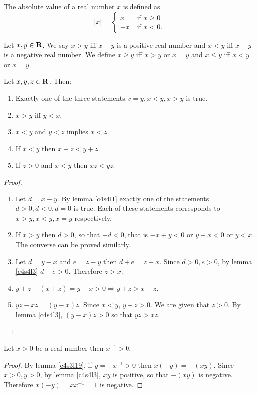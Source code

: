 \begin{defn}\label{c4s4d3}
The absolute value of a real number $x$ is defined as 
\[
|x| = \begin{cases}
 x & \text{ if } x \ge 0 \\
 -x & \text{ if } x < 0.
\end{cases}
\]
\end{defn}

\begin{defn}\label{c4s4d4}
Let $x, y \in \mathbf{R}$. We say $x > y$ iff $x - y$ is a positive real number
and $x < y$ iff $x - y$ is a negative real number. We define $x \ge y$ iff
$x > y$ or $x = y$ and $x \le y$ iff $x < y$ or $x = y$.
\end{defn}

\begin{prop}\label{c4s4p1}
Let $x, y, z \in \mathbf{R}$. Then:
\begin{enumerate}
\item Exactly one of the three statements $x = y, x < y, x > y$ is true.
\item $x > y$ iff $y < x$.
\item $x < y$ and $y < z$ implies $x < z$.
\item If $x < y$ then $x + z < y + z$.
\item If $z > 0$ and $x < y$ then $xz < yz$.
\end{enumerate}
\end{prop}
\begin{proof}
\begin{enumerate}
\item Let $d = x - y$. By lemma \ref{c4s4l1} exactly one of the statements
$d > 0, d < 0, d = 0$ is true. Each of these statements corresponds to 
$x > y, x < y, x = y$ respectively.
\item If $x > y$ then $d > 0$, so that $-d < 0$, that is $-x + y < 0$ or 
$y - x < 0$ or $y < x$. The converse can be proved similarly.
\item Let $d = y - x$ and $e = z - y$ then $d + e = z - x$. Since $d > 0,
e > 0$, by lemma \ref{c4s4l3} $d + e > 0$. Therefore $z > x$.
\item $y + z - (x + z) = y - x > 0 \Rightarrow y + z > x + z$.
\item $yz - xz = (y - x)z$. Since $x < y$, $y - z > 0$. We are given that
$z > 0$. By lemma \ref{c4s4l3}, $(y - x)z > 0$ so that $yz > xz$.
\end{enumerate}
\end{proof}

\begin{lem}\label{c4s4l4}
Let $x > 0$ be a real number then $x^{-1} > 0$.
\end{lem}
\begin{proof}
By lemma \ref{c4s3l19}, if $y = -x^{-1} > 0$ then $x(-y) = -(xy)$. Since
$x > 0, y > 0$, by lemma \ref{c4s4l3}, $xy$ is positive, so that $-(xy)$
is negative. Therefore $x(-y) = xx^{-1} = 1$ is negative.
\end{proof}

